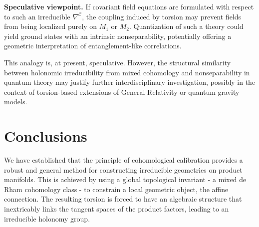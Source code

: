 \documentclass[12pt]{article}
\begin{document}
\medskip
\noindent
\textbf{Speculative viewpoint.}  
If covariant field equations are formulated with respect to such an irreducible $\nabla^{\mathcal{C}}$, the coupling induced by torsion may prevent fields from being localized purely on $M_1$ or $M_2$.  
Quantization of such a theory could yield ground states with an intrinsic nonseparability, potentially offering a geometric interpretation of entanglement-like correlations.

\medskip
\noindent
This analogy is, at present, speculative.  
However, the structural similarity between holonomic irreducibility from mixed cohomology and nonseparability in quantum theory may justify further interdisciplinary investigation, possibly in the context of torsion-based extensions of General Relativity or quantum gravity models.

\section{Conclusions}

We have established that the principle of cohomological calibration provides a robust and general method for constructing irreducible geometries on product manifolds. This is achieved by using a global topological invariant - a mixed de Rham cohomology class - to constrain a local geometric object, the affine connection. The resulting torsion is forced to have an algebraic structure that inextricably links the tangent spaces of the product factors, leading to an irreducible holonomy group.
\end{document}

